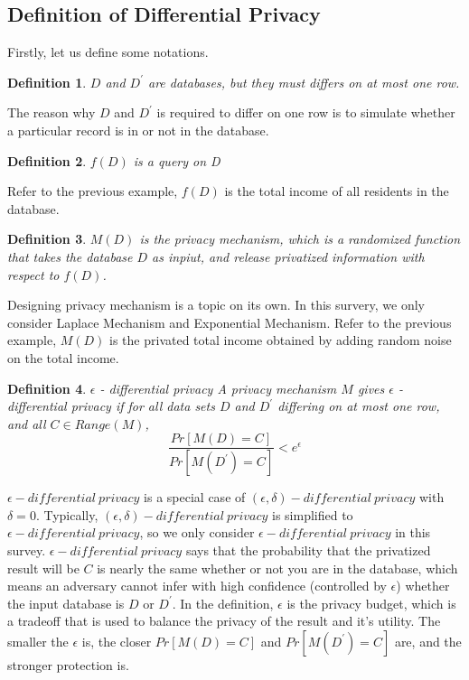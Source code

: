 \documentclass[a4paper, 11pt]{article} %
\newtheorem{definition}{Definition}[section]
\begin{document}
\subsection{Definition of Differential Privacy}
Firstly, let us define some notations.
\theoremstyle{definition}
\begin{definition}{}
 $D$ and $D^\prime$ are databases, but they must differs on at most one row.
\end{definition}
The reason why $D$ and $D^\prime$ is required to differ on one row is to simulate whether a particular record is in or not in the database.
\begin{definition}{}
$f(D)$ is a query on D
\end{definition}
Refer to the previous example, $f(D)$ is the total income of all residents in the database.
\begin{definition}{}
	$M(D)$ is the privacy mechanism, which is a randomized function that takes the database $D$ as inpiut, and release privatized information with respect to $f(D)$.
\end{definition}
Designing privacy mechanism is a topic on its own\cite{mcsherry2007mechanism}. In this survery, we only consider Laplace Mechanism and Exponential Mechanism. Refer to the previous example, $M(D)$ is the privated total income obtained by adding random noise on the total income.
\begin{definition}{$\epsilon$ - differential privacy}
	A privacy mechanism $M$ gives $\epsilon$ - differential privacy if for all data sets $D$ and $D^\prime$ differing on at most one row, and all $C\in Range(M)$,
	\[  \frac{Pr[M(D) = C]}{Pr[M(D^\prime) = C]}< e^\epsilon \]
\end{definition}
$\epsilon - differential \ privacy$ is a special case of $(\epsilon,\delta) - differential \ privacy$\cite{dwork2011differential,dwork2006our} with $\delta = 0$. Typically, $(\epsilon,\delta) - differential \ privacy$ is simplified to $\epsilon - differential \ privacy$, so we only consider $\epsilon - differential \ privacy$ in this survey. $\epsilon - differential \ privacy$ says that the probability that the privatized result will be $C$ is nearly the same whether or not you are in the database, which means an adversary cannot infer with high confidence (controlled by $\epsilon$) whether the input database is $D$ or $D^\prime$. In the definition, $\epsilon$ is the privacy budget, which is a tradeoff that is used to balance the privacy of the result and it's utility. The smaller the $\epsilon$ is, the closer $Pr[M(D) = C]$ and $Pr[M(D^\prime) = C]$ are, and the stronger protection is.
\end{document}
